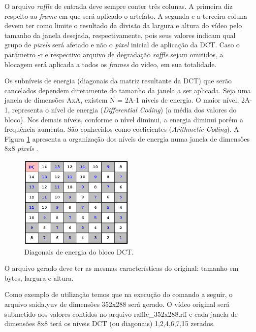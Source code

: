 O arquivo \emph{raffle} de entrada deve sempre conter três colunas. A primeira diz respeito ao \emph{frame} em que será aplicado o artefato. A segunda e a terceira coluna devem ter como limite o resultado da divisão da largura e altura do vídeo pelo tamanho da janela desejada, respectivamente, pois seus valores indicam qual grupo de \emph{pixels} será afetado e não o \emph{pixel} inicial de aplicação da DCT. Caso o parâmetro -r e respectivo arquivo de degradação \emph{raffle} sejam omitidos, a blocagem será aplicada a todos os \emph{frames} do vídeo, em sua totalidade.

Os subníveis de energia (diagonais da matriz resultante da DCT) que serão cancelados dependem diretamente do tamanho da janela a ser aplicada. Seja uma janela de dimensões AxA, existem N = 2A-1 níveis de energia. O maior nível, 2A-1, representa o nível de energia  (\emph{Differential Coding}) (a média dos valores do bloco). Nos demais níveis, conforme o nível diminui, a energia diminui porém a frequência aumenta. São conhecidos como coeficientes  (\emph{Arithmetic Coding}). A Figura \ref{fig:niveisdct} apresenta a organização dos níveis de energia numa janela de dimensões 8x8 \emph{pixels} .

\begin{figure}[!htb]
	\centering
	\includegraphics[width=0.5\textwidth]{./imgs/niveisdct.png}
	\caption{Diagonais de energia do bloco DCT.}
	\label{fig:niveisdct}
	\fonte{\cite{}}
\end{figure}

O arquivo gerado deve ter as mesmas características do original: tamanho em bytes, largura e altura.

Como exemplo de utilização temos que na execução do comando a seguir, o arquivo saida.yuv de dimensões 352x288 será gerado. O vídeo original será submetido aos valores contidos no arquivo raffle\_352x288.rff e cada janela de dimensões 8x8 terá os níveis DCT (ou diagonais) 1,2,4,6,7,15 zerados.

